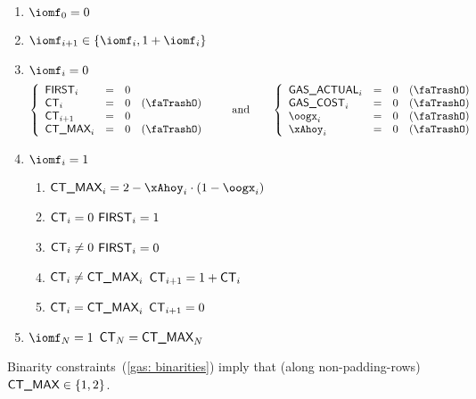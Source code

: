 \begin{enumerate}
	\item $\iomf_{0} = 0$
	\item $\iomf_{i + 1} \in \{ \iomf_{i}, 1 + \iomf_{i} \}$
	\item \If $\iomf_{i} = 0$ \Then 
		\[
			\left\{ \begin{array}{lclr}
				\first _{i}     & = & 0 \\
				\ct    _{i}     & = & 0 & (\trash) \\
				\ct    _{i + 1} & = & 0 \\
				\maxCt _{i}     & = & 0 & (\trash) \\
			\end{array} \right.
			\qquad\text{and}\qquad
			\left\{ \begin{array}{lclr}
				\gasActual  _{i} & = & 0 & (\trash) \\
				\gasCost    _{i} & = & 0 & (\trash) \\
				\oogx       _{i} & = & 0 & (\trash) \\
				\xAhoy      _{i} & = & 0 & (\trash) \\
			\end{array} \right.
		\]
	\item \If $\iomf_{i} = 1$ \Then
		\begin{enumerate}
			\item $\maxCt_{i} = 2 - \xAhoy_{i} \cdot (1 - \oogx_{i})$
			\item \label{gas: heartbeat: FIRST equals 1 when ct is zero} \If $\textsf{CT}_{i} =    0$ \Then $\textsf{FIRST} _{i} = 1$
			\item \label{gas: heartbeat: FIRST vanishes for nonzero ct}  \If $\textsf{CT}_{i} \neq 0$ \Then $\textsf{FIRST} _{i} = 0$
			\item \label{gas: heartbeat: ct and ct_max: increment}       \If $\textsf{CT}_{i} \neq \textsf{CT\_MAX}_{i}$ \Then $\textsf{CT}_{i + 1} = 1 + \textsf{CT}_{i}$
			\item \label{gas: heartbeat: ct and ct_max: setup}           \If $\textsf{CT}_{i} =    \textsf{CT\_MAX}_{i}$ \Then $\textsf{CT}_{i + 1} = 0$
		\end{enumerate}
	\item \label{gas: heartbeat: finalization} \If $\iomf_{N} = 1$ \Then $\textsf{CT}_{N} = \textsf{CT\_MAX}_{N}$
\end{enumerate}
\saNote{} Binarity constraints~(\ref{gas: binarities}) imply that (along non-padding-rows) $\textsf{CT\_MAX} \in \{ 1, 2 \}$.

